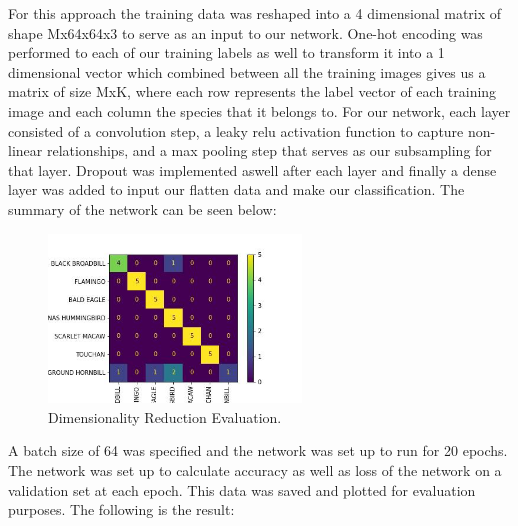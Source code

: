 \documentclass[11pt]{article}
\begin{document}
\begin{singlespace}
For this approach the training data was reshaped into a 4 dimensional matrix of shape Mx64x64x3 to serve as an input to our network. One-hot encoding was performed to each of our training labels as well to transform it into a 1 dimensional vector which combined between all the training images gives us a matrix of size MxK, where each row represents the label vector of each training image and each column the species that it belongs to. For our network, each layer consisted of a convolution step, a leaky relu activation function to capture non-linear relationships, and a max pooling step that serves as our subsampling for that layer. Dropout was implemented aswell after each layer and finally a dense layer was added to input our flatten data and make our classification. The summary of the network can be seen below: \\

\begin{figure}[h]
    \centering
    \includegraphics[width=0.6\textwidth]{plots/dim-red-cf.jpg}
    \caption{Dimensionality Reduction Evaluation.}
\end{figure} 

A batch size of 64 was specified and the network was set up to run for 20 epochs. The network was set up to calculate accuracy as well as loss of the network on a validation set at each epoch. This data was saved and plotted for evaluation purposes. The following is the result: \\

\begin{figure}[h]
    \centering
    

\end{figure}
\end{singlespace}
\end{document}
